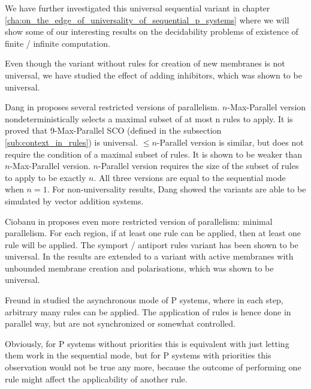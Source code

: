 We have further investigated this universal sequential variant in chapter \ref{cha:on_the_edge_of_universality_of_sequential_p_systems} where we will show some of our interesting results on the decidability problems of existence of finite / infinite computation.

Even though the variant without rules for creation of new membranes is not universal, we have studied the effect of adding inhibitors, which was shown to be universal.


Dang in \cite{Ibarra04dang} proposes several restricted versions of parallelism.
$n$-Max-Parallel version nondeterministically selects a maximal subset of at most n rules to apply. It is proved that 9-Max-Parallel SCO (defined in the subsection \ref{sub:context_in_rules}) is universal.
$\leq n$-Parallel version is similar, but does not require the condition of a maximal subset of rules. It is shown to be weaker than $n$-Max-Parallel version.
$n$-Parallel version requires the size of the subset of rules to apply to be exactly $n$.
All three versions are equal to the sequential mode when $n=1$. For non-universality results, Dang showed the variants are able to be simulated by vector addition systems.


Ciobanu in \cite{Ciobanu05MinimalParallelism} proposes even more restricted version of parallelism: minimal parallelism. For each region, if at least one rule can be applied, then at least one rule will be applied. The symport / antiport rules variant has been shown to be universal. In \cite{Ciobanu:2007:MinimalParallelism} the results are extended to a variant with active membranes with unbounded membrane creation and polarisations, which was shown to be universal.


Freund in \cite{Freund:2004:Async} studied the asynchronous mode of P systems, where in each step, arbitrary many rules can be applied. The application of rules is hence done in parallel way, but are not synchronized or somewhat controlled.

Obviously, for P systems without priorities this is equivalent with just letting them work in the sequential mode, but for P systems with priorities this observation would not be true any more, because the outcome of performing one rule might affect the applicability of another rule.

